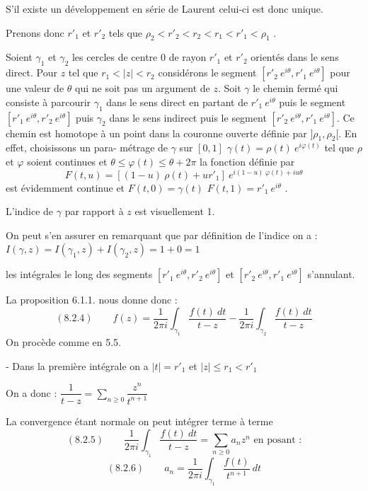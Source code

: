 
S'il existe un développement en série de Laurent celui-ci est donc unique.

Prenons donc $r'_1$ et $r'_2$ tels que $\rho_2 < r'_2 < r_2 < r_1 < r'_1 < \rho_1$ .

Soient $\gamma_1$ et $\gamma_2$ les cercles de centre 0 de rayon $r'_1$ et $r'_2$ orientés
dans le sens direct. Pour $z$ tel que $r_1 < |z| < r_2$ considérons le segment
$[r'_2\ e^{i\theta}, r'_1\ e^{i\theta}]$ pour une valeur de $\theta$ qui ne soit pas un argument de $z$.
Soit $\gamma$ le chemin fermé qui consiste à parcourir $\gamma_1$ dans le sens direct en
partant de $r'_1\ e^{i\theta}$ puis le segment $[r'_1\ e^{i\theta}, r'_2\ e^{i\theta}]$ puis $\gamma_2$ dans le sens
indirect puis le segment $[r'_2\ e^{i\theta}, r'_1\ e^{i\theta}]$. Ce chemin est homotope à un point
dans la couronne ouverte définie par $]\rho_1 , \rho_2[$. En effet, choisissons un para-%
métrage de $\gamma$ sur $[0,1]$ $\gamma(t) = \rho(t)\ e^{i\varphi(t)}$ tel que $\rho$et $\varphi$ soient continues
et $\theta \leq \varphi(t) \leq \theta+2\pi$ la fonction définie par
\[ F(t,u) = [(1-u)\ \rho(t) + ur'_1]\ e^{i(1-u)\ \varphi(t) + iu\theta} \]
est évidemment continue et $F(t,0) = \gamma(t)$ \quad $F(t,1) = r'_1\ e^{i\theta}$ .

L'indice de $\gamma$ par rapport à $z$ est visuellement 1.

On peut s'en assurer en remarquant que par définition de l'indice
on a : \qquad $I(\gamma,z) = I(\gamma_1,z) + I(\gamma_2,z) = 1+0 = 1$

les intégrales le long des segments $[r'_1\ e^{i\theta}, r'_2\ e^{i\theta}]$ et
$[r'_2\ e^{i\theta}, r'_1\ e^{i\theta}]$ s'annulant.

La proposition 6.1.1. nous donne donc :
\[ (8.2.4) \qquad f(z) = \frac{1}{2\pi i}\int_{\gamma_1} \frac{f(t)\ dt}{t-z} - \frac{1}{2\pi i}\int_{\gamma_2} \frac{f(t)\ dt}{t-z} \]
On procède comme en 5.5.

- Dans la première intégrale on a $|t| = r'_1$ et $|z| \leq r_1 < r'_1$

On a donc : $\dfrac{1}{t-z} = \sum\limits_{n \geq 0} \dfrac{z^n}{t^{n+1}}$

La convergence étant normale on peut intégrer terme à terme
\[ (8.2.5) \qquad \frac{1}{2\pi i} \int_{\gamma_1} \frac{f(t)\ dt}{t-z} = \sum_{n \geq 0} a_n z^n \text{ en posant :} \]
\[ (8.2.6) \qquad a_n = \frac{1}{2\pi i}\int_{\gamma_1} \frac{f(t)}{t^{n+1}}\ dt \]


